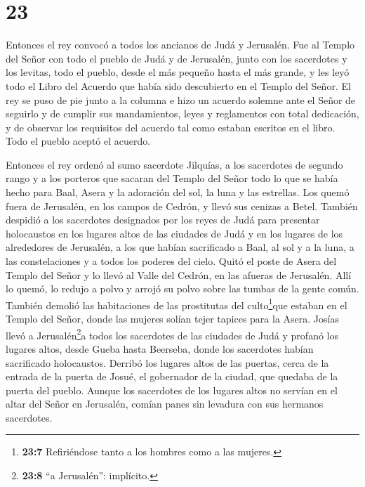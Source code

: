 \hypertarget{section-22}{%
\section{23}\label{section-22}}

 Entonces el rey convocó a todos los ancianos de Judá y
Jerusalén.  Fue al Templo del Señor con todo el pueblo de
Judá y de Jerusalén, junto con los sacerdotes y los levitas, todo el
pueblo, desde el más pequeño hasta el más grande, y les leyó todo el
Libro del Acuerdo que había sido descubierto en el Templo del Señor.
 El rey se puso de pie junto a la columna e hizo un acuerdo
solemne ante el Señor de seguirlo y de cumplir sus mandamientos, leyes y
reglamentos con total dedicación, y de observar los requisitos del
acuerdo tal como estaban escritos en el libro. Todo el pueblo aceptó el
acuerdo.

 Entonces el rey ordenó al sumo sacerdote Jilquías, a los
sacerdotes de segundo rango y a los porteros que sacaran del Templo del
Señor todo lo que se había hecho para Baal, Asera y la adoración del
sol, la luna y las estrellas. Los quemó fuera de Jerusalén, en los
campos de Cedrón, y llevó sus cenizas a Betel.  También
despidió a los sacerdotes designados por los reyes de Judá para
presentar holocaustos en los lugares altos de las ciudades de Judá y en
los lugares de los alrededores de Jerusalén, a los que habían
sacrificado a Baal, al sol y a la luna, a las constelaciones y a todos
los poderes del cielo.  Quitó el poste de Asera del Templo
del Señor y lo llevó al Valle del Cedrón, en las afueras de Jerusalén.
Allí lo quemó, lo redujo a polvo y arrojó su polvo sobre las tumbas de
la gente común.  También demolió las habitaciones de las
prostitutas del culto\footnote{\textbf{23:7} Refiriéndose tanto a los
  hombres como a las mujeres.}que estaban en el Templo del Señor, donde
las mujeres solían tejer tapices para la Asera.  Josías
llevó a Jerusalén\footnote{\textbf{23:8} ``a Jerusalén'': implícito.}a
todos los sacerdotes de las ciudades de Judá y profanó los lugares
altos, desde Gueba hasta Beerseba, donde los sacerdotes habían
sacrificado holocaustos. Derribó los lugares altos de las puertas, cerca
de la entrada de la puerta de Josué, el gobernador de la ciudad, que
quedaba de la puerta del pueblo.  Aunque los sacerdotes de
los lugares altos no servían en el altar del Señor en Jerusalén, comían
panes sin levadura con sus hermanos sacerdotes.

